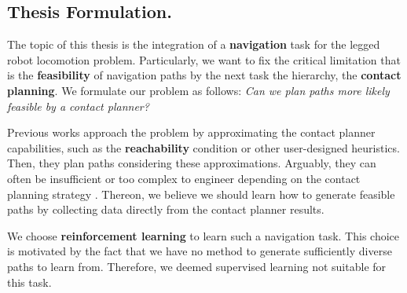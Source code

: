 \subsection{Thesis Formulation.}

The topic of this thesis is the integration of a \textbf{navigation} task for the legged robot locomotion problem.
Particularly, we want to fix the critical limitation that is the \textbf{feasibility} of navigation paths by the next task the hierarchy, the \textbf{contact planning}.
We formulate our problem as follows: \textit{Can we plan paths more likely feasible by a contact planner?}

Previous works approach the problem by approximating the contact planner capabilities, such as the \textbf{reachability} condition \cite{RB-PRM} or other user-designed heuristics.
Then, they plan paths considering these approximations.
Arguably, they can often be insufficient or too complex to engineer depending on the contact planning strategy \cite{AcyclicCP, winkler_2014}.
Thereon, we believe we should learn how to generate feasible paths by collecting data directly from the contact planner results.

We choose \textbf{reinforcement learning} to learn such a navigation task.
This choice is motivated by the fact that we have no method to generate sufficiently diverse paths to learn from. Therefore, we deemed supervised learning not suitable for this task.

